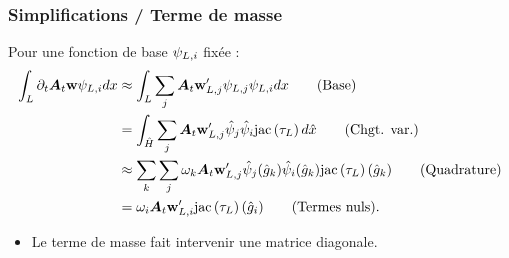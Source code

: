 \begin{frame}
\frametitle{Simplifications / Terme de masse}
\vfill
Pour une fonction de base $\psi_{L,i}$ fixée :
\begin{align*}
	\int_{L} \partial_{t} \bm{A}_{t} \bm{\mathrm{w}} \psi_{L,i} dx
	&\approx \int_{L} \sum_{j}
		\bm{A}_{t} \bm{\mathrm{w}}'_{L,j} \psi_{L,j} \psi_{L,i} dx
		\tag{Base} \\
	&= \int_{\hat{H}} \sum_{j}
		\bm{A}_{t} \bm{\mathrm{w}}'_{L,j}
		\hat{\psi}_{j} \hat{\psi}_{i}
		\mathrm{jac}\left(\tau_{L}\right) d\hat{x}
		\tag{Chgt. var.} \\
	&\approx \sum_{k} \sum_{j}
		\omega_{k} \bm{A}_{t} \bm{\mathrm{w}}'_{L,j}
		\hat{\psi}_{j}(\hat{g}_{k}) \hat{\psi}_{i}(\hat{g}_{k})
		\mathrm{jac}\left(\tau_{L}\right)(\hat{g}_{k})
		\tag{Quadrature} \\
	&= \omega_{i} \bm{A}_{t} \bm{\mathrm{w}}'_{L,i}
		\mathrm{jac}\left(\tau_{L}\right) (\hat{g}_{i})
		\tag{Termes nuls} .
\end{align*}
\vfill
\begin{itemize}
\item Le terme de masse fait intervenir une matrice diagonale.
\end{itemize}
\end{frame}

